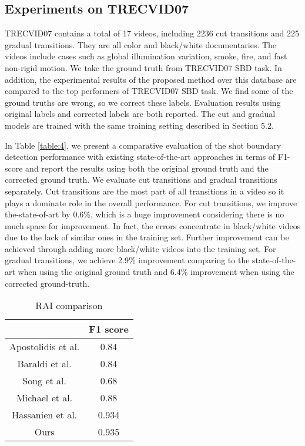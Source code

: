 \documentclass[runningheads]{llncs}
\begin{document}
\subsection{Experiments on TRECVID07}
TRECVID07 contains a total of 17 videos, including 2236 cut transitions and 225 gradual transitions. They are all color and black/white documentaries. The videos include cases such as global illumination variation, smoke, fire, and fast non-rigid motion. We take the ground truth from TRECVID07 SBD task. In addition, the experimental results of the proposed method over this database are compared to the top performers of TRECVID07 SBD task. We find some of the ground truths are wrong, so we correct these labels. Evaluation results using original labels and corrected labels are both reported. The cut and gradual models are trained with the same training setting described in Section 5.2.

In Table \ref{table:4}, we present a comparative evaluation of the shot boundary detection performance with existing state-of-the-art approaches in terms of F1-score and report the results using both the original ground truth and the corrected ground truth. We evaluate cut transitions and gradual transitions separately. Cut transitions are the most part of all transitions in a video so it plays a dominate role in the overall performance. For cut transitions, we improve the-state-of-art by 0.6\%, which is a huge improvement considering there is no much space for improvement. In fact, the errors concentrate in black/white videos due to the lack of similar ones in the training set. Further improvement can be achieved through adding more black/white videos into the training set. For gradual transitions, we achieve 2.9\%  improvement comparing to the state-of-the-art when using the original ground truth and 6.4\% improvement when using the corrected ground-truth.
\vspace{-2em}
\begin{table}
\centering
\begin{tabular} {c|c}
\hline &F1 score \\
\hline Apostolidis et al.\cite{apostolidis2014fast}&0.84\\
\hline Baraldi et al.\cite{baraldi2015shot}&0.84\\ 
\hline Song et al.\cite{song2016click}&0.68\\ 
\hline Michael et al.\cite{gygli2017ridiculously}&0.88\\
\hline Hassanien et al.\cite{hassanien2017large}&0.934\\
\hline Ours&0.935\\
\hline
\end{tabular}
\caption[RAI comparison]{RAI comparison}
\end{table}
\vspace{-3em}
\end{document}

